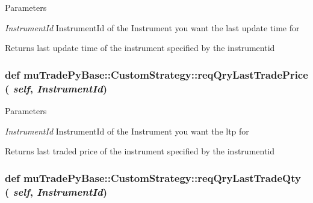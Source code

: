 \begin{DoxyParams}{Parameters}
\item[{\em InstrumentId}]InstrumentId of the Instrument you want the last update time for \end{DoxyParams}
\begin{DoxyReturn}{Returns}
last update time of the instrument specified by the instrumentid 
\end{DoxyReturn}
\hypertarget{classmuTradePyBase_1_1CustomStrategy_a652f9a24a6b95f2f960555e5593c1fee}{
\subsubsection[{reqQryLastTradePrice}]{\setlength{\rightskip}{0pt plus 5cm}def muTradePyBase::CustomStrategy::reqQryLastTradePrice ( {\em self}, \/   {\em InstrumentId})}}
\label{classmuTradePyBase_1_1CustomStrategy_a652f9a24a6b95f2f960555e5593c1fee}

\begin{DoxyParams}{Parameters}
\item[{\em InstrumentId}]InstrumentId of the Instrument you want the ltp for \end{DoxyParams}
\begin{DoxyReturn}{Returns}
last traded price of the instrument specified by the instrumentid 
\end{DoxyReturn}
\hypertarget{classmuTradePyBase_1_1CustomStrategy_a0a48ea343fcdffbf9bb24bcb0384af1d}{
\subsubsection[{reqQryLastTradeQty}]{\setlength{\rightskip}{0pt plus 5cm}def muTradePyBase::CustomStrategy::reqQryLastTradeQty ( {\em self}, \/   {\em InstrumentId})}}
\label{classmuTradePyBase_1_1CustomStrategy_a0a48ea343fcdffbf9bb24bcb0384af1d}

